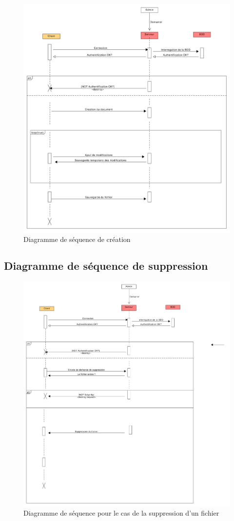 	\begin{figure}[hb]
	\centering
	\includegraphics[scale=.32]{setup/diagramme_sequence_creation.png}
	
	\caption{Diagramme de séquence de création}
	\end{figure}
	
	\newpage
	
	\subsection{Diagramme de séquence de suppression}
	
	\begin{figure}[hb]
	\centering
	\includegraphics[scale=.3]{setup/diagramme_sequence_suppression.png}
	
	\caption{Diagramme de séquence pour le cas de la suppression d'un fichier}
	\end{figure}
	

		
